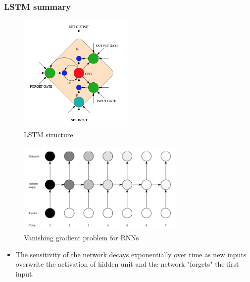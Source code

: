 \documentclass{beamer}
\begin{document}
\frame
{
    \frametitle{LSTM summary}
	\begin{figure}[ht]  
		\begin{center}
			\includegraphics[width=2.2in]{Images/LSTM.png}   
		\end{center}   
		\caption{LSTM structure}
	\end{figure}
}
\frame
{
	\begin{figure}[ht]  
		\begin{center}
			\includegraphics[width=3.2in]{Images/rnn_vanishing_gradients.png}   
		\end{center}   
		\caption{Vanishing gradient problem for RNNs}
	\end{figure}
	\vspace{-0.5cm}
	\begin{itemize}
		\item The sensitivity of the network decays exponentially over time as new inputs overwrite the activation of hidden unit and the network "forgets" the first input. 
	\end{itemize}
}
\frame
\end{document}
